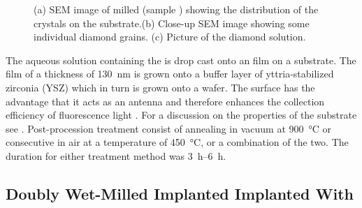 \begin{figure}[!htb]
\begin{minipage}[b]{0.49\textwidth}
\begin{subfigure}[b]{\linewidth}
		         			\caption{}\label{subfig::diamond_solution}
		       		\end{subfigure}
		     	\end{minipage}
			\caption[Pictures of wet-milled \nds.]{(a) SEM image of milled \nds (sample \insituH) showing the distribution of the \nd crystals on the \ir substrate.(b) Close-up SEM image showing some individual diamond grains. (c) Picture of the diamond solution.}\label{fig::pics_wetmilled}
		\end{figure}

		The aqueous solution containing the \nds is drop cast onto an \ir film on a \Si substrate.
		The \ir film of a thickness of \SI{130}{nm} is grown onto a buffer layer of yttria-stabilized zirconia (YSZ) which in turn is grown onto a \Si wafer.
		The \ir surface has the advantage that it acts as an antenna and therefore enhances the collection efficiency of fluorescence light \cite{Neu2012a}. For a discussion on the properties of the substrate see .
		Post-procession treatment consist of annealing in vacuum at \SI{900}{\degreeCelsius} or consecutive \ox in air at a temperature of \SI{450}{\degreeCelsius}, or a combination of the two.
		The duration for either treatment method was \SIrange{3}{6}{\hour}.

	\subsection{Doubly Wet-Milled Implanted \Nds Implanted With \Si}\label{subsec::2_milled_nds}

